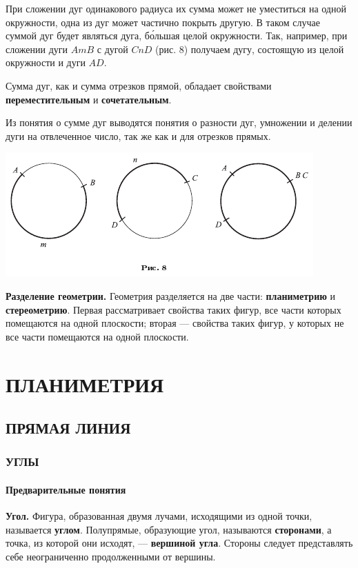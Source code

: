 \documentclass[oneside]{book}
\begin{document}
При сложении дуг одинакового радиуса их сумма может не уместиться на одной окружности, одна из дуг может частично покрыть другую.
В таком случае суммой дуг будет являться дуга, б\'{о}льшая целой окружности.
Так, например, при сложении дуги $AmB$ с дугой $CnD$ (рис. 8) получаем дугу, состоящую из целой окружности и дуги $AD$.

Сумма дуг, как и сумма отрезков прямой, обладает свойствами \textbf{переместительным} и \textbf{сочетательным}.

Из понятия о сумме дуг выводятся понятия о разности дуг, умножении и делении дуги на отвлеченное число, так же как и для отрезков прямых.

\includegraphics{pics/ris-8}

\textbf{Разделение геометрии.}
Геометрия разделяется на две части:
\textbf{планиметрию} и \textbf{стереометрию}.
Первая рассматривает свойства таких фигур, все части которых помещаются на одной плоскости;
вторая — свойства таких фигур, у которых не все части помещаются на одной плоскости.



\part{ПЛАНИМЕТРИЯ}

\chapter{ПРЯМАЯ ЛИНИЯ}


\section{УГЛЫ} 

\subsection*{Предварительные понятия}

\textbf{Угол.}
Фигура, образованная двумя лучами, исходящими из одной точки, называется \textbf{углом}.
Полупрямые, образующие угол, называются \textbf{сторонами}, а точка, из которой они исходят, — \textbf{вершиной угла}.
Стороны следует представлять себе неограниченно продолженными от вершины.
\end{document}
